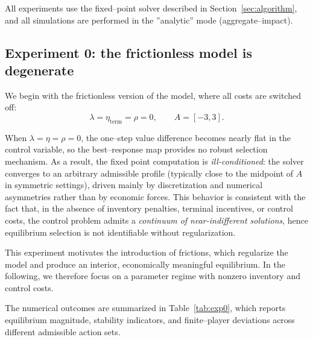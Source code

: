 \documentclass[11pt]{article}
\theoremstyle{definition}
\begin{document}
All experiments use the fixed--point solver described in 
Section~\ref{sec:algorithm}, and all simulations are performed in the
''analytic'' mode (aggregate--impact).

\subsection*{Experiment 0: the frictionless model is degenerate}

We begin with the frictionless version of the model, where all costs are 
switched off:
\[
\lambda = \eta_{\mathrm{term}} = \rho = 0,
\qquad
A = [-3,3].
\]

When $\lambda=\eta=\rho=0$, the one--step value difference becomes nearly flat in the control variable, so the best--response map provides no robust selection mechanism.
As a result, the fixed point computation is \emph{ill-conditioned}: the solver converges to an arbitrary admissible profile (typically close to the midpoint of $A$ in symmetric settings), driven mainly by discretization and numerical asymmetries rather than by economic forces.
This behavior is consistent with the fact that, in the absence of inventory penalties, terminal incentives, or control costs, the control problem admits a \emph{continuum of near-indifferent solutions}, hence equilibrium selection is not identifiable without regularization.

This experiment motivates the introduction of frictions, which regularize the model and 
produce an interior, economically meaningful equilibrium.  
In the following, we therefore focus on a parameter regime with nonzero inventory 
and control costs.

The numerical outcomes are summarized in
Table~\ref{tab:exp0}, which reports equilibrium magnitude, stability indicators, and finite--player deviations across different admissible action sets.


\end{document}

